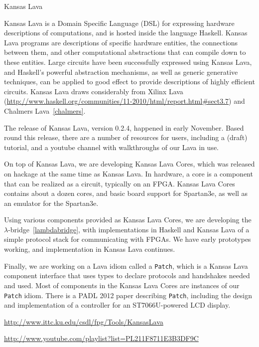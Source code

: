 \begin{hcarentry}{Kansas Lava}
\label{klava}
\makeheader

Kansas Lava is a Domain Specific Language (DSL) for expressing
hardware descriptions of computations, and is hosted inside the
language Haskell. Kansas Lava programs are descriptions of specific hardware
entities, the connections between them, and other computational abstractions
that can compile down to these entities. Large circuits have been successfully
expressed using Kansas Lava, and Haskell's powerful abstraction mechanisms, as
well as generic generative techniques, can be applied to good effect to provide
descriptions of highly efficient circuits.
Kansas Lava draws considerably from Xilinx Lava~%
(\url{http://www.haskell.org/communities/11-2010/html/report.html#sect3.7})
and
Chalmers Lava~\cref{chalmers}.

The release of Kansas Lava, version 0.2.4, happened in early November.
Based round this release, there are a number of resources for users,
including a (draft) tutorial, and a youtube channel with
walkthroughs of our Lava in use.

On top of Kansas Lava, we are developing Kansas Lava Cores, which was released
on hackage at the same time as Kansas Lava. In hardware, a core is a component
that can be realized as a circuit, typically on an FPGA. Kansas Lava Cores
contains about a dozen cores, and basic board support for Spartan3e,
as well as an emulator for the Spartan3e.

Using various components provided as Kansas Lava Cores, we are developing the
$\lambda$-bridge~\cref{lambdabridge}, with implementations in Haskell and
Kansas Lava of a simple protocol stack for communicating with FPGAs. We have
early prototypes working, and implementation in Kansas Lava continues.

Finally, we are working on a Lava idiom called a {\tt Patch}, which is a Kansas
Lava component interface that uses types to declare protocols and handshakes
needed and used. Most of components in the Kansas Lava Cores are instances of
our {\tt Patch} idiom. There is a PADL 2012 paper describing {\tt Patch},
including the design and implementation of a controller for an ST7066U-powered
LCD display.

\FurtherReading
\begin{compactitem}
\item
  \url{http://www.ittc.ku.edu/csdl/fpg/Tools/KansasLava}\\
\item
  \url{http://www.youtube.com/playlist?list=PL211F8711E3B3DF9C}  
\end{compactitem}
\end{hcarentry}
